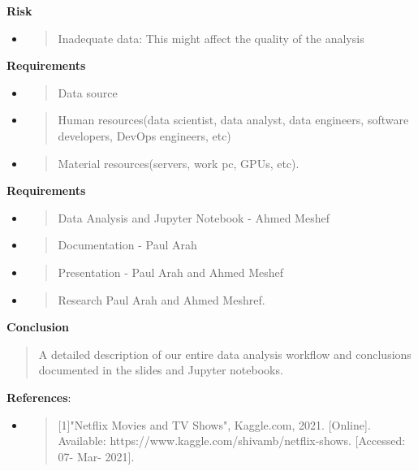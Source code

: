 \documentclass[]{article}
\begin{document}
\textbf{Risk}

\begin{itemize}
\item
  \begin{quote}
  Inadequate data: This might affect the quality of the analysis
  \end{quote}
\end{itemize}

\textbf{Requirements}

\begin{itemize}
\item
  \begin{quote}
  Data source
  \end{quote}
\item
  \begin{quote}
  Human resources(data scientist, data analyst, data engineers, software
  developers, DevOps engineers, etc)
  \end{quote}
\item
  \begin{quote}
  Material resources(servers, work pc, GPUs, etc).
  \end{quote}
\end{itemize}

\textbf{Requirements}

\begin{itemize}
\item
  \begin{quote}
  Data Analysis and Jupyter Notebook - Ahmed Meshef
  \end{quote}
\item
  \begin{quote}
  Documentation - Paul Arah
  \end{quote}
\item
  \begin{quote}
  Presentation - Paul Arah and Ahmed Meshef
  \end{quote}
\item
  \begin{quote}
  Research Paul Arah and Ahmed Meshref.
  \end{quote}
\end{itemize}

\textbf{Conclusion}

\begin{quote}
A detailed description of our entire data analysis workflow and
conclusions documented in the slides and Jupyter notebooks.
\end{quote}

\textbf{References}:

\begin{itemize}
\item
  \begin{quote}
  {[}1{]}"Netflix Movies and TV Shows", Kaggle.com, 2021. {[}Online{]}.
  Available: https://www.kaggle.com/shivamb/netflix-shows. {[}Accessed:
  07- Mar- 2021{]}.
  \end{quote}
\end{itemize}
\end{document}
